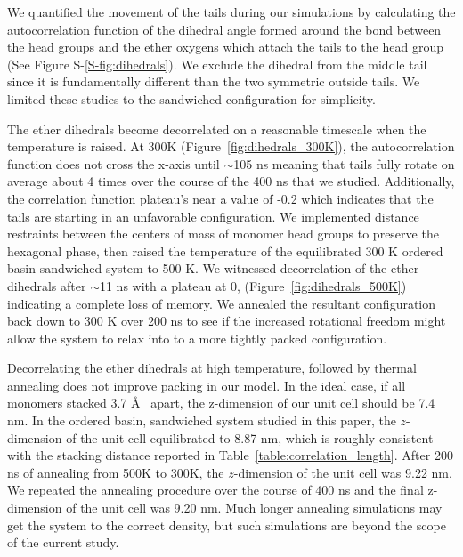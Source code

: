 \documentclass[journal=jpcbfk,manuscript=article]{achemso}
\begin{document}
  We quantified the movement of the tails during our simulations by calculating the 
  autocorrelation function of the dihedral angle formed around the bond between the 
  head groups and the ether oxygens which attach the tails to the head group 
  (See Figure S-\ref{S-fig:dihedrals}). We exclude the dihedral from the middle tail 
  since it is fundamentally different than the two symmetric outside tails. We 
  limited these studies to the sandwiched configuration for simplicity.
  
  The ether dihedrals become decorrelated on a reasonable timescale when the temperature
  is raised. At 300K (Figure~\ref{fig:dihedrals_300K}), the autocorrelation function does
  not cross the x-axis until $\sim$105 ns meaning that tails fully rotate on average about 
  4 times over the course of the 400 ns that we studied. Additionally, the correlation 
  function plateau's near a value of -0.2 which indicates that the tails are starting in 
  an unfavorable configuration. We implemented distance restraints between the centers of 
  mass of monomer head groups to preserve the hexagonal phase, then raised the temperature 
  of the equilibrated 300 K ordered basin sandwiched system to 500 K. We witnessed 
  decorrelation of the ether dihedrals after $\sim$11 ns with a plateau at 0, 
  (Figure~\ref{fig:dihedrals_500K}) indicating a complete loss of memory. We annealed
  the resultant configuration back down to 300 K over 200 ns to see if the increased rotational
  freedom might allow the system to relax into to a more tightly packed configuration.
  
  Decorrelating the ether dihedrals at high temperature, followed by thermal annealing
  does not improve packing in our model. In the ideal case, if all monomers stacked 
  3.7 \AA~ apart, the z-dimension of our unit cell should be 7.4 nm. In the ordered basin, 
  sandwiched system studied in this paper, the $z$-dimension of the unit cell equilibrated 
  to 8.87 nm, which is roughly consistent with the stacking distance reported in 
  Table~\ref{table:correlation_length}. After 200 ns of annealing from 500K to 300K, the 
  $z$-dimension of the unit cell was 9.22 nm. We repeated the annealing procedure over the 
  course of 400 ns and the final z-dimension of the unit cell was 9.20 nm. Much longer
  annealing simulations may get the system to the correct density, but such simulations are beyond
  the scope of the current study.
\end{document}
